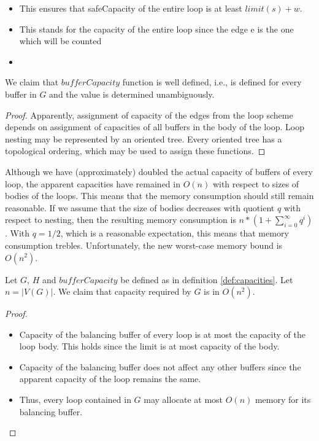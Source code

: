 \begin{itemize}
\begin{itemize}
      \item {}
        
        This ensures that safeCapacity of the entire loop is at least $limit(s) + w$. 
      \item {}
        
        This stands for the capacity of the entire loop since the edge e is the one which will be counted
      \item {}
    \end{itemize}
  \end{itemize}
\myenddef

We claim that $bufferCapacity$ function is well defined, i.e., is defined for every buffer in $G$ and the value is determined unambiguously.
  \begin{proof}
    Apparently, assignment of capacity of the edges from the loop scheme depends on assignment of capacities of all buffers in the body of the loop. Loop nesting may be represented by an oriented tree. Every oriented tree has a topological ordering, which may be used to assign these functions.
  \end{proof}
\myendclaim

  Although we have (approximately) doubled the actual capacity of buffers of every loop, the apparent capacities have remained in $O(n)$ with respect to sizes of bodies of the loops. This means that the memory consumption should still remain reasonable. If we assume that the size of bodies decreases with quotient $q$ with respect to nesting, then the resulting memory consumption is $n*(1+\sum_{i=0}^{\infty}q^i)$. With $q=1/2$, which is a reasonable expectation, this means that memory consumption trebles. Unfortunately, the new worst-case memory bound is $O(n^2)$.

  Let $G$, $H$ and $bufferCapacity$ be defined as in definition \ref{def:capacities}. Let $n=| V(G) |$. We claim that capacity required by $G$ is in $O(n^2)$. 
  \begin{proof}\ 
    \begin{itemize}
      \item Capacity of the balancing buffer of every loop is at most the capacity of the loop body. This holds since the limit is at most capacity of the body.
      \item Capacity of the balancing buffer does not affect any other buffers since the apparent capacity of the loop remains the same.
      \item Thus, every loop contained in $G$ may allocate at most $O(n)$ memory for its balancing buffer.
    \end{itemize}
  \end{proof}
\myendclaim

